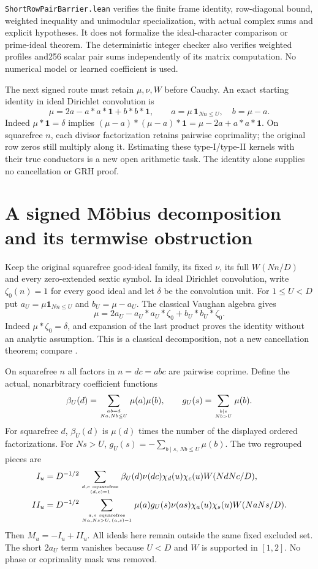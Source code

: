 \documentclass[11pt,oneside,openany]{book}
\theoremstyle{definition}\newtheorem{definition}[theorem]{Definition}
\theoremstyle{remark}\newtheorem{remark}[theorem]{Remark}
\begin{document}
\texttt{ShortRowPairBarrier.lean} verifies the finite frame identity,
row-diagonal bound, weighted inequality and unimodular specialization,
with actual complex sums and explicit hypotheses. It does not formalize
the ideal-character comparison or prime-ideal theorem. The deterministic
integer checker also verifies weighted profiles and256 scalar pair sums
independently of its matrix computation. No numerical model or learned
coefficient is used.

The next signed route must retain $\mu,\nu,W$ before Cauchy. An exact
starting identity in ideal Dirichlet convolution is
\[
 \mu=2a-a*a*\mathbf1+b*b*\mathbf1,\qquad
 a=\mu\,\mathbf1_{Nn\le U},\quad b=\mu-a.
\]
Indeed $\mu*\mathbf1=\delta$ implies
$(\mu-a)*(\mu-a)*\mathbf1=\mu-2a+a*a*\mathbf1$.
On squarefree $n$, each divisor factorization retains pairwise
coprimality; the original row zeros still multiply along it. Estimating
these type-I/type-II kernels with their true conductors is a new open
arithmetic task. The identity alone supplies no cancellation or GRH proof.

\section{A signed M\"obius decomposition and its termwise obstruction}
\label{sec:mobius-split}
Keep the original squarefree good-ideal family, its fixed $\nu$, its
full $W(Nn/D)$ and every zero-extended sextic symbol. In ideal Dirichlet
convolution, write $\zeta_0(n)=1$ for every good ideal and let $\delta$
be the convolution unit. For $1\le U<D$ put
$a_U=\mu\mathbf1_{Nn\le U}$ and $b_U=\mu-a_U$. The classical Vaughan
algebra gives
\begin{equation}\label{eq:mobius-split}
 \mu=2a_U-a_U*a_U*\zeta_0+b_U*b_U*\zeta_0.
\end{equation}
Indeed $\mu*\zeta_0=\delta$, and expansion of the last product proves the
identity without an analytic assumption. This is a classical decomposition,
not a new cancellation theorem; compare \cite[Lemma4.1]{GreenTaoVaughan}.

On squarefree $n$ all factors in $n=d c=a b c$ are pairwise coprime.
Define the actual, nonarbitrary coefficient functions
\[
 \beta_U(d)=\sum_{ab=d\atop Na,Nb\le U}\mu(a)\mu(b),\qquad
 g_U(s)=\sum_{b\mid s\atop Nb>U}\mu(b).
\]
For squarefree $d$, $\beta_U(d)$ is $\mu(d)$ times the number of the
displayed ordered factorizations. For $Ns>U$,
$g_U(s)=-\sum_{b\mid s,\,Nb\le U}\mu(b)$. The two regrouped pieces are
\begin{align*}
 I_u&=D^{-1/2}\sum_{d,c\ {\rm squarefree}\atop(d,c)=1}
  \beta_U(d)\nu(dc)\chi_d(u)\chi_c(u)W(NdNc/D),\\
 II_u&=D^{-1/2}\sum_{a,s\ {\rm squarefree}\atop Na,Ns>U,\,(a,s)=1}
  \mu(a)g_U(s)\nu(as)\chi_a(u)\chi_s(u)W(NaNs/D).
\end{align*}
Then $M_u=-I_u+II_u$. All ideals here remain outside the same fixed
excluded set. The short $2a_U$ term vanishes because $U<D$ and $W$ is
supported in $[1,2]$. No phase or coprimality mask was removed.
\end{document}
